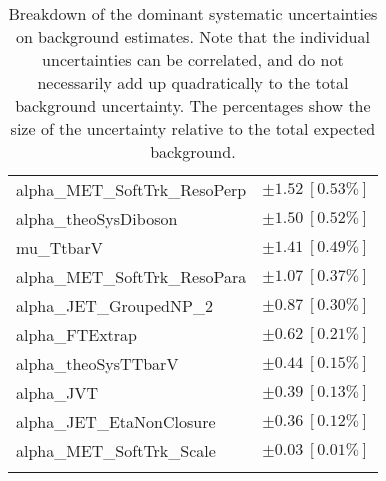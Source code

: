 \begin{table}
\begin{center}
\begin{tabular*}{\textwidth}{@{\extracolsep{\fill}}lc}
alpha\_MET\_SoftTrk\_ResoPerp         & $\pm 1.52\ [0.53\%] $       \\
alpha\_theoSysDiboson         & $\pm 1.50\ [0.52\%] $       \\
mu\_TtbarV         & $\pm 1.41\ [0.49\%] $       \\
alpha\_MET\_SoftTrk\_ResoPara         & $\pm 1.07\ [0.37\%] $       \\
alpha\_JET\_GroupedNP\_2         & $\pm 0.87\ [0.30\%] $       \\
alpha\_FTExtrap         & $\pm 0.62\ [0.21\%] $       \\
alpha\_theoSysTTbarV         & $\pm 0.44\ [0.15\%] $       \\
alpha\_JVT         & $\pm 0.39\ [0.13\%] $       \\
alpha\_JET\_EtaNonClosure         & $\pm 0.36\ [0.12\%] $       \\
alpha\_MET\_SoftTrk\_Scale         & $\pm 0.03\ [0.01\%] $       \\
\noalign{\smallskip}\hline\noalign{\smallskip}
\end{tabular*}
\end{center}
\caption[Breakdown of uncertainty on background estimates]{
Breakdown of the dominant systematic uncertainties on background estimates.
Note that the individual uncertainties can be correlated, and do not necessarily add up quadratically to 
the total background uncertainty. The percentages show the size of the uncertainty relative to the total expected background.
\label{table.results.bkgestimate.uncertainties.VRTopC}}
\end{table}
%
